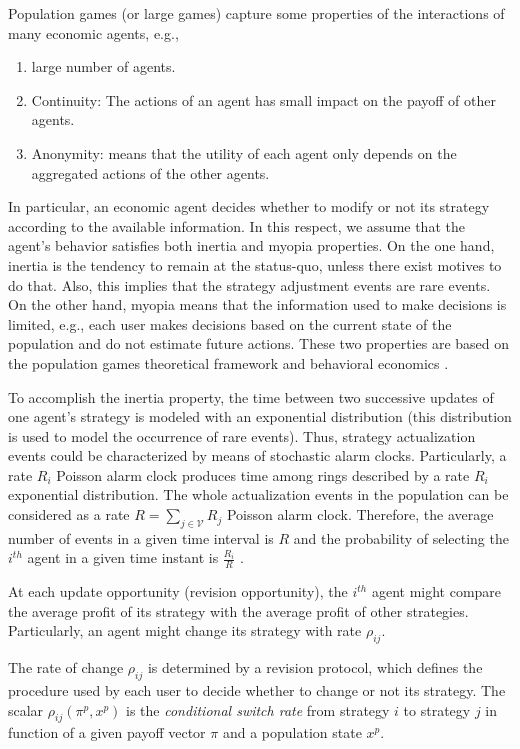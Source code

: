 \documentclass[a4paper,10pt]{article}
\def\th{^{th}}
\def\th{^{th}}
\begin{document}
Population games (or large games) capture some properties of the interactions of many economic agents, e.g., 

\begin{enumerate}
\item large number of agents.
\item Continuity: The actions of an agent has small impact on the payoff of other agents.
\item Anonymity: means that the utility of each agent only depends on the aggregated actions of the other agents.
\end{enumerate}



In particular, an economic agent decides whether to modify or not its strategy according to the available information. In this respect, we assume that the agent's behavior satisfies both inertia and myopia properties. On the one hand, inertia 
is the tendency to remain at the status-quo, unless there exist motives to do that.
Also, this implies that the strategy adjustment events are rare events.
On the other hand, myopia means that the information used to make decisions is limited, e.g., each user makes decisions based on the current state of the population and do not estimate future actions. These two properties are based on the population games theoretical framework \cite{sandholm_book}
and behavioral economics \cite{gal}.

To accomplish the inertia property, the time between two successive updates of one 
agent's strategy is modeled with an exponential distribution (this distribution is used to model the occurrence of rare events). 
Thus, strategy actualization events could be characterized by means of stochastic alarm clocks.
Particularly, a rate $R_i$ Poisson alarm clock produces time among rings described by
a rate $R_i$ exponential distribution.
The whole actualization events in the population can be considered as a rate $R=\sum_{j\in \mathcal{V}} R_j$ Poisson alarm clock.
Therefore, the average number of events in a given time interval is $R$ and the probability of selecting the $i^{th}$
agent in a given time instant is
 $\frac{R_i}{R}$ \cite{sandholm_book}.

At each update opportunity (revision opportunity), the $i\th$ agent might compare the average profit of its strategy with the average profit of other strategies. Particularly, an agent might change its strategy with rate $\rho_{ij}$.
 
 The rate of change $\rho_{ij}$ is determined by a revision protocol, which defines the procedure used by each user to decide whether to change or not its strategy. The scalar $\rho_{ij} (\pi^p, x^p)$ is the \emph{conditional switch rate} from strategy $i$ to strategy $j$ in function of a given payoff vector $\pi$ and a population state $x^p$.
 
\end{document}
